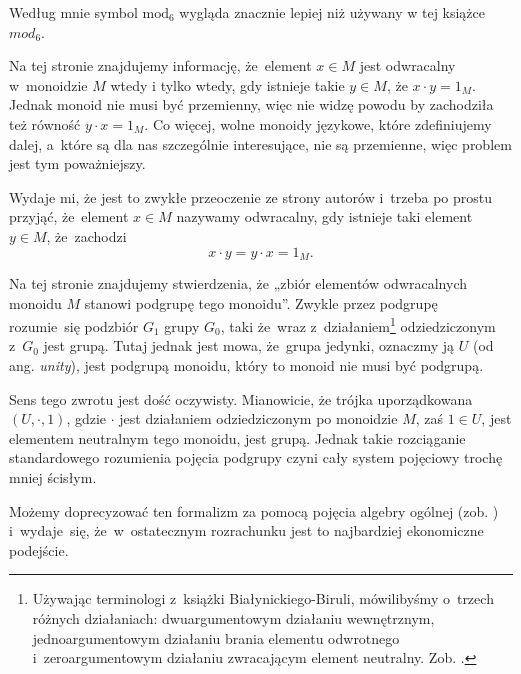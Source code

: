 \documentclass[a4paper,11pt]{article}
\begin{document}
\start {} Według mnie symbol $\textrm{mod}_{ 6 }$ wygląda
znacznie lepiej niż używany w tej książce $mod_{ 6 }$.

\vspace{\spaceFour}





\start {} Na tej stronie znajdujemy informację, że~element
$x \in M$ jest odwracalny w~monoidzie $M$ wtedy i tylko wtedy, gdy
istnieje takie $y \in M$, że $x \cdot y = 1_{ M }$. Jednak monoid nie
musi być przemienny, więc nie widzę powodu by zachodziła też równość
$y \cdot x = 1_{ M }$. Co więcej, wolne monoidy językowe, które
zdefiniujemy dalej, a~które są dla nas szczególnie interesujące, nie
są przemienne, więc problem jest tym poważniejszy.

Wydaje mi, że jest to zwykłe przeoczenie ze strony autorów i~trzeba po
prostu przyjąć, że~element $x \in M$ nazywamy odwracalny, gdy istnieje
taki element $y \in M$, że~zachodzi
\begin{equation}
  \label{eq:Forys-Forys-01}
  x \cdot y = y \cdot x = 1_{ M }.
\end{equation}

\vspace{\spaceFour}





\start {} Na tej stronie znajdujemy stwierdzenia, że „zbiór
elementów odwracalnych monoidu $M$ stanowi podgrupę tego monoidu”.
Zwykle przez podgrupę rozumie~się podzbiór $G_{ 1 }$ grupy $G_{ 0 }$,
taki że~wraz z~działaniem\footnote{Używając terminologi z~książki
  Białynickiego-Biruli, mówilibyśmy o~trzech różnych działaniach:
  dwuargumentowym działaniu wewnętrznym, jednoargumentowym działaniu brania
  elementu odwrotnego i~zeroargumentowym działaniu zwracającym element
  neutralny. Zob. \cite{BialynickiBirulaZarysAlgebry1987}.} odziedziczonym
z~$G_{ 0 }$ jest grupą. Tutaj
jednak jest mowa, że~grupa jedynki, oznaczmy ją $U$ (od ang.
\textit{unity}), jest podgrupą monoidu, który to monoid nie musi być
podgrupą.

Sens tego zwrotu jest dość oczywisty. Mianowicie, że trójka uporządkowana
$( U, \cdot, 1 )$, gdzie $\cdot$ jest działaniem odziedziczonym po
monoidzie $M$, zaś $1 \in U$, jest elementem neutralnym tego monoidu,
jest grupą. Jednak takie rozciąganie standardowego rozumienia pojęcia podgrupy czyni cały system pojęciowy trochę mniej ścisłym.

Możemy doprecyzować ten formalizm za pomocą pojęcia algebry
ogólnej (zob. \cite{BialynickiBirulaZarysAlgebry1987}) i~wydaje~się, że~w~ostatecznym rozrachunku jest to najbardziej ekonomiczne podejście.
\end{document}
